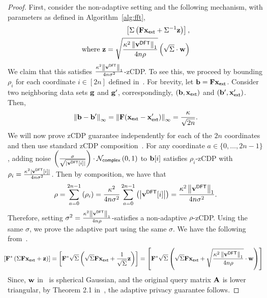 \begin{proof}
First, consider the non-adaptive setting and the following mechanism, with parameters as defined in Algorithm~\ref{alg:fft},
\begin{align}
 \left[\Sigma\left(\mathbf{F}\mathbf{x}_{\sf ext}+\Sigma^{-1}\mathbf{z}\right)\right],\nonumber\\  \text{where $\mathbf{z}=\sqrt{\frac{\kappa^2\left\|\mathbf{v}^{\sf DFT}\right\|_1}{4n\rho}}\left(\sqrt{\Sigma}\cdot\mathbf{w}\right)$}  
 \label{eq:factmech1}
\end{align}
We claim that this satisfies $\frac{\kappa^2\left\|\mathbf{v}^{\sf DFT}\right\|_1}{4n\sigma^2}$-zCDP. To see this, we proceed by bounding $\rho_i$ for each coordinate $i \in [2n]$ defined in~. 
For brevity, let $\mathbf{b}=\mathbf{F}\mathbf{x}_{\sf ext}$. Consider two neighboring data sets $\mathbf{g}$ and $\mathbf{g}'$, correspondingly, $(\mathbf{b},\mathbf{x}_{\sf ext})$ and $(\mathbf{b}',\mathbf{x}_{\sf ext}')$. Then,
\begin{equation}
    \left\|\mathbf{b}-\mathbf{b}'\right\|_\infty=\left\|\mathbf{F}(\mathbf{x}_{\sf ext}-\mathbf{x}_{\sf ext}')\right\|_\infty=\frac{\kappa}{\sqrt{2n}}.\label{eq:sens}
\end{equation}
We will now prove zCDP guarantee independently for each of the $2n$ coordinates and then use standard zCDP composition~\citep{bun2016concentrated}. For any coordinate $a\in\{0,\ldots,2n-1\}$, adding noise $\left(\frac{\sigma}{\sqrt{|\mathbf{v}^{\sf DFT}[i]|}}\right)\cdot \mathcal{N}_{\sf complex}\left(0,1\right)$ to $\mathbf{b}[i]$ satisfies $\rho_i$-zCDP with $\rho_i=\frac{\kappa^2|\mathbf{v}^{\sf DFT}[i]|}{4n\sigma^2}$. Then by composition, we have that
\begin{equation}
    \rho = \sum\limits_{a=0}^{2n-1} \left(\rho_i\right)=\frac{\kappa^2}{4n\sigma^2}\sum\limits_{a=0}^{2n-1}\left(\left|\mathbf{v}^{\sf DFT}[i]\right|\right)=\frac{\kappa^2\left\|\mathbf{v}^{\sf DFT}\right\|_1}{4n\sigma^2}.
    \label{eq:zCDPtot}
\end{equation}
Therefore, setting $\sigma^2=\frac{\kappa^2\left\|\mathbf{v}^{\sf DFT}\right\|_1}{4n\rho}$-satisfies a non-adaptive $\rho$-zCDP. Using the same $\sigma$, we prove the adaptive part using the same $\sigma$. We have the following from~.
{\small
\begin{equation}
    \hspace{-2.5mm}\left[\fft\herm\left(\Sigma\fft\exd+\bfz\right)\right]=
    \left[\fft\herm\sqrt{\Sigma}\left(\sqrt{\Sigma}\fft\exd+\frac{1}{\sqrt{\Sigma}}\bfz\right)\right]=
    \left[\fft\herm\sqrt{\Sigma}\left(\sqrt{\Sigma}\fft\exd+\sqrt{\frac{\kappa^2\lone{\fexdt}}{4n\rho}}\cdot\bfw\right)\right]
    \label{eq:0uf}
\end{equation}}
Since, $\mathbf{w}$ in~ is spherical Gaussian, and the original query matrix $\mathbf{A}$ is lower triangular, by Theorem 2.1 in~\citet{denisov22matfact}, the adaptive privacy guarantee follows.
\end{proof}


